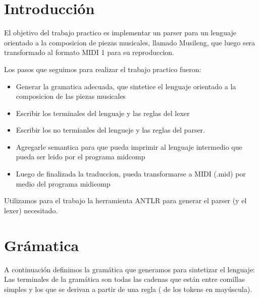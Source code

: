 \documentclass[a4paper]{article}
\begin{document}
\restoregeometry

\clearpage


\tableofcontents

\vspace{3cm}

\clearpage


\section{Introducción}
El objetivo del trabajo practico es implementar un parser para un lenguaje orientado a la composicion de piezas musicales, llamado Musileng, que luego sera transformado al formato MIDI 1 para su reproduccion.

Los pasos que seguimos para realizar el trabajo practico fueron:

\begin{itemize}
\item Generar la gramatica adecuada, que sintetice el lenguaje orientado a la composicion de las piezas musicales
\item Escribir los terminales del lenguaje y las reglas del lexer
\item Escribir los no termianles del lengueje y las reglas del parser.
\item Agregarle semantica para que pueda imprimir al lenguaje intermedio que pueda ser leido por el programa midcomp
\item Luego de finalizada la traduccion, pueda transformarse a MIDI (.mid) por medio del programa midicomp
\end{itemize}

Utilizamos para el trabajo la herramienta ANTLR para generar el parser (y el lexer) necesitado.


\section{Grámatica}

A continuación definimos la gramática que generamos para sintetizar el lenguaje:
Las terminales de la gramática son todas las cadenas que están entre comillas simples y los que se derivan a partir de una regla ( de los tokens en mayúscula).
\end{document}
